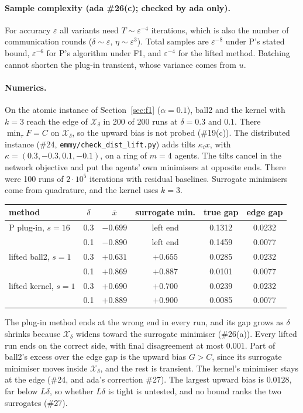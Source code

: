 \documentclass{article}
\begin{document}
\paragraph{Sample complexity (ada \#26(c); checked by ada only).} For
accuracy $\varepsilon$ all variants need $T\sim\varepsilon^{-4}$
iterations, which is also the number of communication rounds
($\delta\sim\varepsilon$, $\eta\sim\varepsilon^3$). Total samples are
$\varepsilon^{-8}$ under P's stated bound, $\varepsilon^{-6}$ for P's
algorithm under F1, and $\varepsilon^{-4}$ for the lifted method. Batching
cannot shorten the plug-in transient, whose variance comes from $u$.

\paragraph{Numerics.} On the atomic instance of Section~\ref{sec:f1}
($\alpha=0.1$), ball2 and the kernel with $k=3$ reach the edge of
$\mathcal X_\delta$ in 200 of 200 runs at $\delta=0.3$ and $0.1$. There
$\min_\tau F=C$ on $\mathcal X_\delta$, so the upward bias is not probed
(\#19(c)). The distributed instance (\#24,
\texttt{emmy/check\_dist\_lift.py}) adds tilts $\kappa_ix$, with
$\kappa=(0.3,-0.3,0.1,-0.1)$, on a ring of $m=4$ agents. The tilts cancel
in the network objective and put the agents' own minimisers at opposite
ends. There were 100 runs of $2\cdot10^5$ iterations with residual
baselines. Surrogate minimisers come from quadrature, and the kernel uses
$k=3$.
\begin{center}\small
\setlength{\tabcolsep}{4pt}
\begin{tabular}{lccccc}
\hline
method & $\delta$ & $\bar x$ & surrogate min. & true gap & edge gap\\
\hline
P plug-in, $s=16$ & 0.3 & $-0.699$ & left end & 0.1312 & 0.0232\\
 & 0.1 & $-0.890$ & left end & 0.1459 & 0.0077\\
lifted ball2, $s=1$ & 0.3 & $+0.631$ & $+0.655$ & 0.0285 & 0.0232\\
 & 0.1 & $+0.869$ & $+0.887$ & 0.0101 & 0.0077\\
lifted kernel, $s=1$ & 0.3 & $+0.690$ & $+0.700$ & 0.0239 & 0.0232\\
 & 0.1 & $+0.889$ & $+0.900$ & 0.0085 & 0.0077\\
\hline
\end{tabular}
\end{center}
The plug-in method ends at the wrong end in every run, and its gap grows
as $\delta$ shrinks because $\mathcal X_\delta$ widens toward the
surrogate minimiser (\#26(a)). Every lifted run ends on the correct side,
with final disagreement at most $0.001$. Part of ball2's excess over the
edge gap is the upward bias $G>C$, since its surrogate minimiser moves
inside $\mathcal X_\delta$, and the rest is transient. The kernel's
minimiser stays at the edge (\#24, and ada's correction \#27). The largest
upward bias is $0.0128$, far below $L\delta$, so whether $L\delta$ is
tight is untested, and no bound ranks the two surrogates (\#27).
\end{document}
